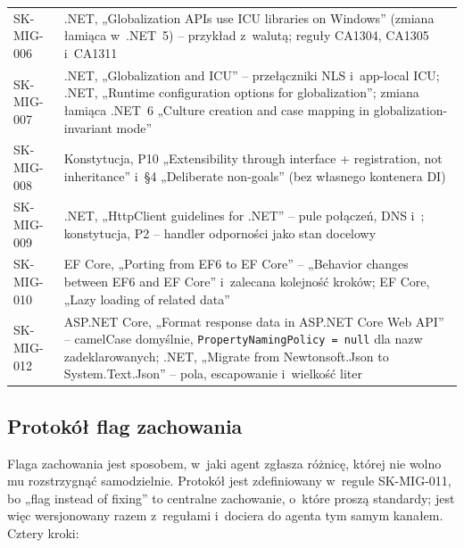 {\begin{xltabular}{\linewidth}{@{}>{\raggedright\arraybackslash}p{2.3cm} >{\raggedright\arraybackslash}X@{}}
SK-MIG-006 & .NET, „Globalization APIs use ICU libraries on Windows” (zmiana łamiąca w~.NET~5) -- przykład z~walutą; reguły CA1304, CA1305 i~CA1311 \\
SK-MIG-007 & .NET, „Globalization and ICU” -- przełączniki NLS i~app-local ICU; .NET, „Runtime configuration options for globalization”; zmiana łamiąca .NET~6 „Culture creation and case mapping in globalization-invariant mode” \\
SK-MIG-008 & Konstytucja, P10 „Extensibility through interface + registration, not inheritance” i~§4 „Deliberate non-goals” (bez własnego kontenera DI) \\
SK-MIG-009 & .NET, „HttpClient guidelines for .NET” -- pule połączeń, DNS i~; konstytucja, P2 -- handler odporności jako stan docelowy \\
SK-MIG-010 & EF Core, „Porting from EF6 to EF Core” -- „Behavior changes between EF6 and EF Core” i~zalecana kolejność kroków; EF Core, „Lazy loading of related data” \\
SK-MIG-012 & ASP.NET Core, „Format response data in ASP.NET Core Web API” -- camelCase domyślnie, \texttt{PropertyNamingPolicy = null} dla nazw zadeklarowanych; .NET, „Migrate from Newtonsoft.Json to System.Text.Json” -- pola, escapowanie i~wielkość liter \\
\bottomrule
\end{xltabular}
}


\subsection{Protokół flag zachowania}\label{sec:standardy-flagi}

Flaga zachowania jest sposobem, w~jaki agent zgłasza różnicę, której nie wolno mu rozstrzygnąć
samodzielnie. Protokół jest zdefiniowany w~regule SK-MIG-011, bo „flag instead of fixing” to
centralne zachowanie, o~które proszą standardy; jest więc wersjonowany razem z~regułami
i~dociera do agenta tym samym kanałem. Cztery kroki:

